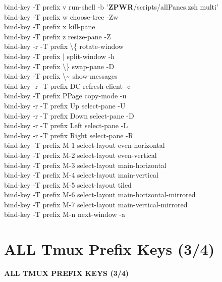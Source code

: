 \documentclass[11pt,a4paper,twoside]{book}
\begin{document}
bind-key  -T prefix  v  run-shell -b '\textbf{ZPWR}/scripts/allPanes.zsh multi'\\
bind-key  -T prefix  w  choose-tree -Zw\\
bind-key  -T prefix  x  kill-pane\\
bind-key  -T prefix  z  resize-pane -Z\\
bind-key -r -T prefix  \textbackslash{}\{  rotate-window\\
bind-key  -T prefix  |  split-window -h\\
bind-key  -T prefix  \textbackslash{}\}  swap-pane -D\\
bind-key  -T prefix  \textbackslash{}\textasciitilde{}  show-messages\\
bind-key -r -T prefix  DC  refresh-client -c\\
bind-key  -T prefix  PPage  copy-mode -u\\
bind-key -r -T prefix  Up  select-pane -U\\
bind-key -r -T prefix  Down  select-pane -D\\
bind-key -r -T prefix  Left  select-pane -L\\
bind-key -r -T prefix  Right  select-pane -R\\
bind-key  -T prefix  M-1  select-layout even-horizontal\\
bind-key  -T prefix  M-2  select-layout even-vertical\\
bind-key  -T prefix  M-3  select-layout main-horizontal\\
bind-key  -T prefix  M-4  select-layout main-vertical\\
bind-key  -T prefix  M-5  select-layout tiled\\
bind-key  -T prefix  M-6  select-layout main-horizontal-mirrored\\
bind-key  -T prefix  M-7  select-layout main-vertical-mirrored\\
bind-key  -T prefix  M-n  next-window -a\\


\vspace{16pt}

\section{ALL Tmux Prefix Keys (3/4)}


\vspace{10pt}
{\large\bfseries\color{neoncyan} ALL TMUX PREFIX KEYS (3/4)}\vspace{6pt}
\end{document}
